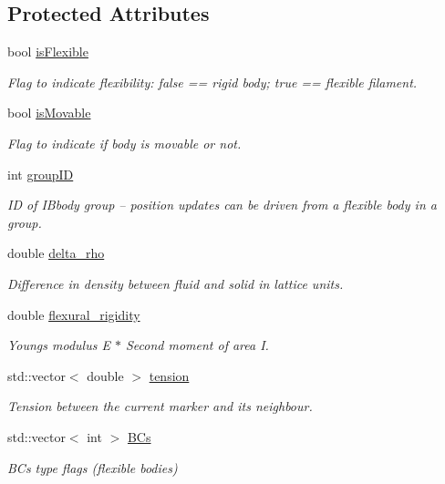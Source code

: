 \subsection*{Protected Attributes}
\begin{DoxyCompactItemize}
\item 
bool \hyperlink{class_i_b_body_a58de7cc12e734b646904e81a56b18b4e}{is\+Flexible}
\begin{DoxyCompactList}\small\item\em Flag to indicate flexibility\+: false == rigid body; true == flexible filament. \end{DoxyCompactList}\item 
bool \hyperlink{class_i_b_body_a9f0773d31ac48e0f5b3174e6040732f9}{is\+Movable}
\begin{DoxyCompactList}\small\item\em Flag to indicate if body is movable or not. \end{DoxyCompactList}\item 
int \hyperlink{class_i_b_body_a4674ade74a2b55ce60a656acfebb4a55}{group\+ID}
\begin{DoxyCompactList}\small\item\em ID of I\+Bbody group -- position updates can be driven from a flexible body in a group. \end{DoxyCompactList}\item 
double \hyperlink{class_i_b_body_a18cd092961f02ecde55363a4d342d098}{delta\+\_\+rho}
\begin{DoxyCompactList}\small\item\em Difference in density between fluid and solid in lattice units. \end{DoxyCompactList}\item 
double \hyperlink{class_i_b_body_a4825a8ef9155062ff9d1011479bd4a9e}{flexural\+\_\+rigidity}
\begin{DoxyCompactList}\small\item\em Young\textquotesingle{}s modulus E $\ast$ Second moment of area I. \end{DoxyCompactList}\item 
std\+::vector$<$ double $>$ \hyperlink{class_i_b_body_ab786e24bc2b303eefcf286e0138cb2d1}{tension}
\begin{DoxyCompactList}\small\item\em Tension between the current marker and its neighbour. \end{DoxyCompactList}\item 
std\+::vector$<$ int $>$ \hyperlink{class_i_b_body_ad9fa313d9cb2c2c463740eed5a1faf16}{B\+Cs}
\begin{DoxyCompactList}\small\item\em B\+Cs type flags (flexible bodies) \end{DoxyCompactList}\end{DoxyCompactItemize}
